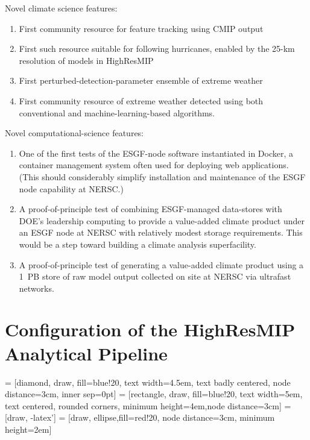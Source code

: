 \documentclass[11pt]{article}
\begin{document}
Novel climate science features:
\begin{enumerate}
\item First community resource for feature tracking using CMIP output
\item First such resource suitable for following hurricanes, enabled by the 25-km resolution of models in HighResMIP
\item First perturbed-detection-parameter ensemble of extreme weather
\item First community resource of extreme weather detected using both conventional and machine-learning-based algorithms.
\end{enumerate}

Novel computational-science features:
\begin{enumerate}
\item One of the first tests of the ESGF-node software instantiated in Docker, a container management system often used for deploying web applications.  (This should considerably simplify installation and maintenance of the ESGF node capability at NERSC.)
\item A proof-of-principle test of combining ESGF-managed data-stores with DOE's leadership computing to provide a value-added climate product under an ESGF node at NERSC with relatively modest  storage requirements. This would be a step toward building a climate analysis superfacility.
\item A proof-of-principle test of generating a value-added climate product using a 1~PB store of raw model output collected on site at NERSC via ultrafast networks.
\end{enumerate}

\section{Configuration of the HighResMIP Analytical Pipeline}
\label{sec:configuration}

 = [diamond, draw, fill=blue!20, 
    text width=4.5em, text badly centered, node distance=3cm, inner sep=0pt]
 = [rectangle, draw, fill=blue!20, 
    text width=5em, text centered, rounded corners, minimum height=4em,node distance=3cm]
 = [draw, -latex']
 = [draw, ellipse,fill=red!20, node distance=3cm,
    minimum height=2em]

\end{document}
